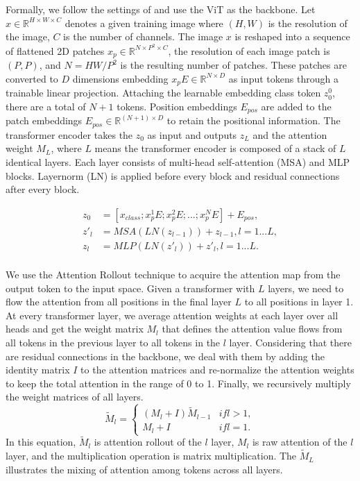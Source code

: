 \documentclass[5p,twocolumn]{elsarticle}
\begin{document}
Formally, we follow the settings of \cite{Dosovitskiy2021Image} and use the ViT as the backbone. Let $x \in \mathbb{R}^{H \times W \times C}$ denotes a given training image where $(H, W)$ is the resolution of the image, $C$ is the number of channels. 
The image $x$ is reshaped into a sequence of flattened 2D patches $x_{p} \in \mathbb{R}^{N \times P^{2}\times C}$, the resolution of each image patch is $(P, P)$, and $N = HW/P^{2}$ is the resulting number of patches. These patches are converted to $D$ dimensions embedding $x_{p}E \in \mathbb{R}^{N \times D}$ as input tokens through a trainable linear projection. Attaching the learnable embedding class token $z_{0}^{0}$, there are a total of $N+1$ tokens. Position embeddings $E_{pos}$ are added to the patch embeddings $E_{pos} \in \mathbb{R}^{(N+1) \times D}$ to retain the positional information. The transformer encoder takes the $z_{0}$ as input and outputs $z_{L}$ and the attention weight $M_{L}$, where $L$ means the transformer encoder is composed of a stack of $L$ identical layers. 
Each layer consists of multi-head self-attention (MSA) and MLP blocks. Layernorm (LN) is applied before every block and residual connections after every block.

\begin{equation}\label{equ.originaltransformer}
\begin{aligned}
z_{0} &= [x_{class};x_{p}^{1}E;x_{p}^{2}E;...;x_{p}^NE] + E_{pos}, \\
z'_{l} &= MSA(LN(z_{l-1})) + z_{l-1}, l = 1...L, \\
z_{l} &= MLP(LN(z'_{l})) + z'_{l}, l = 1...L.\\
\end{aligned}
\end{equation}

We use the Attention Rollout technique \cite{Abnar2020Quantifying} to acquire the attention map from the output token to the input space. Given a transformer with $L$ layers, we need to flow the attention from all positions in the final layer $L$ to all positions in layer 1.
At every transformer layer, we average attention weights at each layer over all heads and get the weight matrix $M_{l}$ that defines the attention value flows from all tokens in the previous layer to all tokens in the $l$ layer.
Considering that there are residual connections in the backbone, we deal with them by adding the identity matrix $I$ to the attention matrices and re-normalize the attention weights to keep the total attention in the range of 0 to 1. Finally, we recursively multiply the weight matrices of all layers. 
\begin{equation}\label{equ.attemap}
\tilde{M}_{l} =\left\{\begin{matrix}
(M_{l} + I)\tilde{M}_{l-1} &  if  l>1, \\  
M_{l}+ I & if  l=1 .
\end{matrix}\right. 
\end{equation}
In this equation, $\tilde{M}_{l}$ is attention rollout of the $l$ layer, $M_{l}$ is raw attention of the $l$ layer, and the multiplication operation is matrix multiplication. The $\tilde{M}_{L}$ illustrates the mixing of attention among tokens across all layers. 
\end{document}
